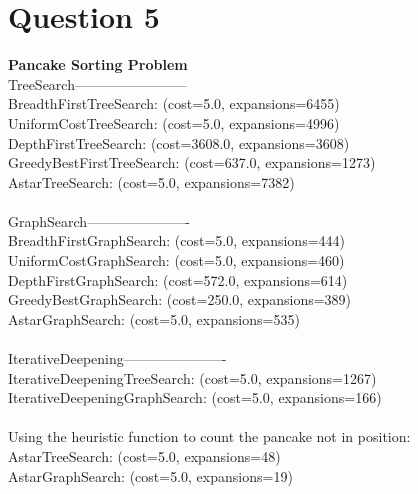 \documentclass[letterpaper, 12pt]{artikel3}
\begin{document}
\section*{Question 5}
\textbf{Pancake Sorting Problem} \\
TreeSearch------------------------\\
BreadthFirstTreeSearch:		(cost=5.0, expansions=6455)	\\
UniformCostTreeSearch:		(cost=5.0, expansions=4996)\\
DepthFirstTreeSearch:		(cost=3608.0, expansions=3608)	\\
GreedyBestFirstTreeSearch:	(cost=637.0, expansions=1273)\\
AstarTreeSearch:		(cost=5.0, expansions=7382)\\
\\
GraphSearch----------------------\\
BreadthFirstGraphSearch:	(cost=5.0, expansions=444)\\
UniformCostGraphSearch:		(cost=5.0, expansions=460)\\
DepthFirstGraphSearch:		(cost=572.0, expansions=614)\\
GreedyBestGraphSearch:		(cost=250.0, expansions=389)\\
AstarGraphSearch:		(cost=5.0, expansions=535)\\
\\
IterativeDeepening----------------------\\
IterativeDeepeningTreeSearch:	(cost=5.0, expansions=1267)\\
IterativeDeepeningGraphSearch:	(cost=5.0, expansions=166)\\
\\
Using the heuristic function to count the pancake not in position:\\
AstarTreeSearch:		(cost=5.0, expansions=48)\\
AstarGraphSearch:		(cost=5.0, expansions=19)	\\
\end{document}

